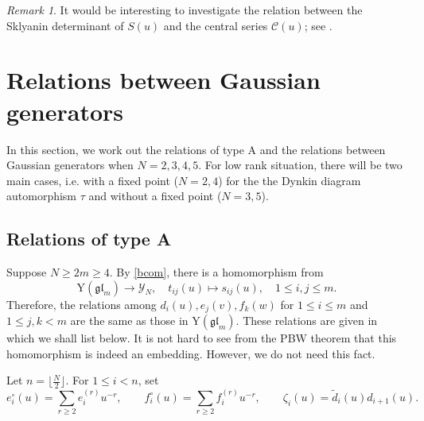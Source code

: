 \documentclass[11pt,reqno]{amsart}
\numberwithin{equation}{section}
\theoremstyle{definition}
\theoremstyle{remark}
\newtheorem{rem}[thm]{Remark}
\newcommand{\gl}{\mathfrak{gl}}
\newcommand{\rY}{\mathrm{Y}}
\newcommand{\tl}{\tilde}
\newcommand{\gge}{\geqslant}
\newcommand{\lle}{\leqslant}
\newcommand{\Y}{{\mathscr{Y}}}
\begin{document}
\begin{rem}
It would be interesting to investigate the relation between the Sklyanin determinant of $S(u)$ and the central series $\mathcal C(u)$; see \cite[Thm. 3.4]{MR02}.
\end{rem}

\section{Relations between Gaussian generators}\label{sec:lowrk}
In this section, we work out the relations of type A and the relations between Gaussian generators when $N=2,3,4,5$. For low rank situation, there will be two main cases, i.e. with a fixed point ($N=2,4$) for the the  Dynkin diagram automorphism $\tau$ and without a fixed point ($N=3,5$).
\subsection{Relations of type A}\label{secA}
Suppose $N\gge 2m \gge  4$. By \eqref{bcom}, there is a homomorphism from
\[
\rY(\gl_{m})\to \Y_N,\quad t_{ij}(u)\mapsto s_{ij}(u),\quad 1\lle i,j\lle m.
\]
Therefore, the relations among $d_i(u),e_{j}(v),f_{k}(w)$ for $1\lle i\lle m$ and $1\lle j,k<m$ are the same as  those in $\rY(\gl_m)$. These relations are given in \cite[Thm. 5.2 and its proof]{BK05} which we shall list below. It is not hard to see from the PBW theorem that this homomorphism is indeed an embedding. However, we do not need this fact.

Let $n=\lfloor\tfrac{N}2\rfloor$. For $1\lle i<n$, set
\[
e_i^\circ(u)=\sum_{r\gge 2}e_i^{(r)}u^{-r},\qquad f_i^\circ(u)=\sum_{r\gge 2}f_i^{(r)}u^{-r},\qquad \zeta_i(u)=\tl d_i(u)d_{i+1}(u).
\]
\end{document}
